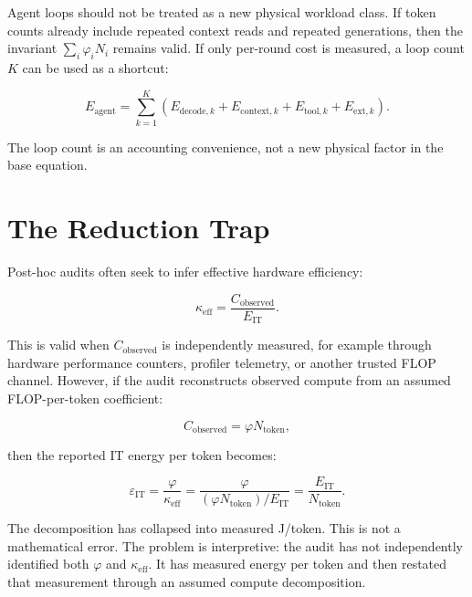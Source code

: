 \documentclass[11pt]{article}
\begin{document}
Agent loops should not be treated as a new physical workload class. If token counts already include repeated context reads and repeated generations, then the invariant \(\sum_i \varphi_i N_i\) remains valid. If only per-round cost is measured, a loop count \(K\) can be used as a shortcut:

\begin{equation}
E_{\mathrm{agent}} =
\sum_{k=1}^{K}
\left(
E_{\mathrm{decode},k}
+
E_{\mathrm{context},k}
+
E_{\mathrm{tool},k}
+
E_{\mathrm{ext},k}
\right).
\end{equation}

The loop count is an accounting convenience, not a new physical factor in the base equation.

\section{The Reduction Trap}

Post-hoc audits often seek to infer effective hardware efficiency:

\begin{equation}
\kappa_{\mathrm{eff}} =
\frac{C_{\mathrm{observed}}}{E_{\mathrm{IT}}}.
\end{equation}

This is valid when \(C_{\mathrm{observed}}\) is independently measured, for example through hardware performance counters, profiler telemetry, or another trusted FLOP channel. However, if the audit reconstructs observed compute from an assumed FLOP-per-token coefficient:

\begin{equation}
C_{\mathrm{observed}} =
\varphi N_{\mathrm{token}},
\end{equation}

then the reported IT energy per token becomes:

\begin{equation}
\varepsilon_{\mathrm{IT}}
=
\frac{\varphi}{\kappa_{\mathrm{eff}}}
=
\frac{\varphi}{(\varphi N_{\mathrm{token}})/E_{\mathrm{IT}}}
=
\frac{E_{\mathrm{IT}}}{N_{\mathrm{token}}}.
\end{equation}

The decomposition has collapsed into measured J/token. This is not a mathematical error. The problem is interpretive: the audit has not independently identified both \(\varphi\) and \(\kappa_{\mathrm{eff}}\). It has measured energy per token and then restated that measurement through an assumed compute decomposition.
\end{document}
